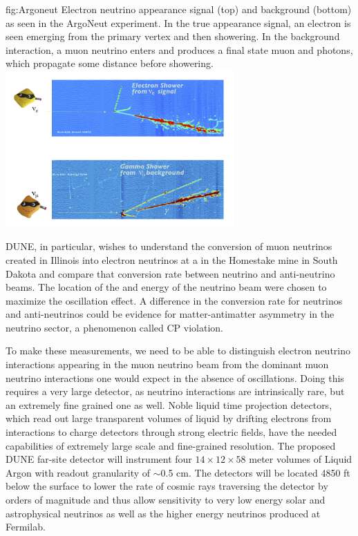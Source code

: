 \documentclass[../main-v1.tex]{subfiles}
\begin{document}
\begin{dunefigure}
{fig:Argoneut}
{Electron neutrino appearance signal (top) and background (bottom) as seen in the ArgoNeut experiment.  In the true appearance signal, an electron is seen emerging from the primary vertex and then showering.  In the background interaction, a muon neutrino enters and  produces a final state muon and photons, which propagate some distance before showering.}
\includegraphics[trim={0cm 0.6cm 2.5cm 0.7cm},clip,height=6cm]{graphics/IntroFigures/Fig_02_Argoneut.jpg} 
\end{dunefigure}


DUNE,  in particular,   wishes to understand the conversion of muon neutrinos created in Illinois into electron neutrinos at a  in the Homestake mine in South Dakota and compare that conversion rate between neutrino and anti-neutrino beams. The location of the  and energy of the neutrino beam were chosen to maximize the oscillation effect.   A difference in the conversion rate for neutrinos and anti-neutrinos could be evidence for matter-antimatter asymmetry in the neutrino sector, a phenomenon called CP violation.  

To make these measurements, we need to be able to distinguish electron neutrino interactions appearing in the muon neutrino beam from the dominant muon neutrino interactions one would expect in the absence of oscillations.  Doing this requires a very large detector, as neutrino interactions are intrinsically rare, but an extremely  fine grained one as well.  Noble liquid time projection detectors, which read out large transparent volumes of liquid by drifting electrons from interactions to charge detectors through strong electric fields, have the needed capabilities of extremely large scale and fine-grained resolution. The proposed DUNE far-site detector will instrument four  $14\times12 \times58$ meter volumes of Liquid Argon with readout granularity of $\sim$0.5 cm.  The detectors will be located 4850 ft below the surface to lower the rate of cosmic rays traversing the detector by orders of magnitude and thus allow sensitivity to very low energy solar and astrophysical neutrinos as well as the higher energy neutrinos produced at Fermilab. 
\end{document}
